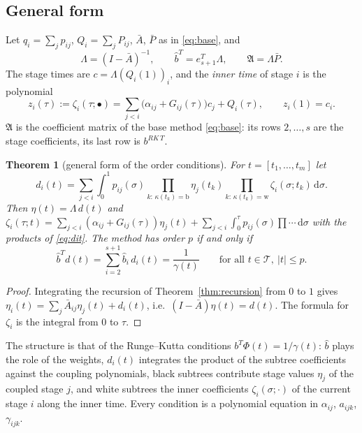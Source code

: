 \documentclass[11pt,a4paper]{article}
\newtheorem{theorem}{Theorem}[section]
\theoremstyle{definition}
\theoremstyle{remark}
\newcommand{\T}{\mathcal{T}}
\newcommand{\dd}{\,\mathrm{d}}
\begin{document}
\subsection{General form}

Let $q_i=\sum_jp_{ij}$, $Q_i=\sum_jP_{ij}$, $\bar A$, $\bar P$ as in \eqref{eq:base}, and
\[
 \Lambda=(I-\bar A)^{-1},\qquad \hat b^T=e_{s+1}^T\Lambda,\qquad \mathfrak A=\Lambda\bar P .
\]
The stage times are $c=\Lambda(Q_i(1))_i$, and the \emph{inner time} of stage $i$ is the polynomial
\[
 z_i(\tau):=\zeta_i(\tau;\bullet)=\sum_{j<i}\big(\alpha_{ij}+G_{ij}(\tau)\big)c_j+Q_i(\tau),\qquad z_i(1)=c_i .
\]
$\mathfrak A$ is the coefficient matrix of the base method \eqref{eq:base}: its rows $2,\dots,s$ are the stage
coefficients, its last row is $b^{RK\,T}$.

\begin{theorem}[general form of the order conditions]\label{thm:general}
For $t=[t_1,\dots,t_m]$ let
\begin{equation}\label{eq:dit}
 d_i(t)=\sum_{j<i}\int_0^1p_{ij}(\sigma)\prod_{k:\,\kappa(t_k)=\mathrm b}\eta_j(t_k)\prod_{k:\,\kappa(t_k)=\mathrm w}\zeta_i(\sigma;t_k)\dd\sigma .
\end{equation}
Then $\eta(t)=\Lambda\,d(t)$ and
$\zeta_i(\tau;t)=\sum_{j<i}(\alpha_{ij}+G_{ij}(\tau))\eta_j(t)+\sum_{j<i}\int_0^\tau p_{ij}(\sigma)\prod\cdots\dd\sigma$ with the
products of \eqref{eq:dit}. The method has order $p$ if and only if
\begin{equation}\label{eq:oc}
 \hat b^Td(t)=\sum_{i=2}^{s+1}\hat b_i\,d_i(t)=\frac1{\gamma(t)}\qquad\text{for all }t\in\T,\ |t|\le p .
\end{equation}
\end{theorem}

\begin{proof}
Integrating the recursion of Theorem~\ref{thm:recursion} from $0$ to $1$ gives $\eta_i(t)=\sum_j\bar A_{ij}\eta_j(t)+d_i(t)$,
i.e.\ $(I-\bar A)\eta(t)=d(t)$. The formula for $\zeta_i$ is the integral from $0$ to $\tau$.
\end{proof}

The structure is that of the Runge--Kutta conditions $b^T\Phi(t)=1/\gamma(t)$: $\hat b$ plays the role of the weights,
$d_i(t)$ integrates the product of the subtree coefficients against the coupling polynomials, black subtrees contribute
stage values $\eta_j$ of the coupled stage $j$, and white subtrees the inner coefficients $\zeta_i(\sigma;\cdot)$ of the
current stage $i$ along the inner time. Every condition is a polynomial equation in $\alpha_{ij}$, $a_{ijk}$,
$\gamma_{ijk}$.
\end{document}
